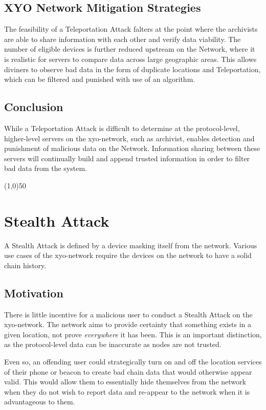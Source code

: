 \documentclass{article}
\begin{document}
\subsection{XYO Network Mitigation Strategies}
The feasibility of a Teleportation Attack falters at the point where the \Glspl{archivist} are able to share information with each other and verify data viability. The number of eligible devices is further reduced upstream on the Network, where it is realistic for servers to compare data across large geographic areas. This allows \Glspl{diviner} to observe bad data in the form of duplicate locations and Teleportation, which can be filtered and punished with use of an algorithm. 

\subsection{Conclusion}
While a Teleportation Attack is difficult to determine at the protocol-level, higher-level servers on the \Gls{xyo-network}, such as \Gls{archivist}, enables detection and punishment of malicious data on the Network. Information sharing between these servers will continually build and append trusted information in order to filter bad data from the system.

\begin{center}
\line(1,0){50}
\end{center}

\section{Stealth Attack}
A Stealth Attack is defined by a device masking itself from the network. Various use cases of the \Gls{xyo-network} require the devices on the network to have a solid chain history. 

\subsection{Motivation}
There is little incentive for a malicious user to conduct a Stealth Attack on the \Gls{xyo-network}. The network aims to provide certainty that something exists in a given location, not prove \textit{everywhere} it has been. This is an important distinction, as the protocol-level data can be inaccurate as nodes are not trusted.

Even so, an offending user could strategically turn on and off the location services of their phone or beacon to create bad chain data that would otherwise appear valid. This would allow them to essentially hide themselves from the network when they do not wish to report data and re-appear to the network when it is advantageous to them.
\end{document}

